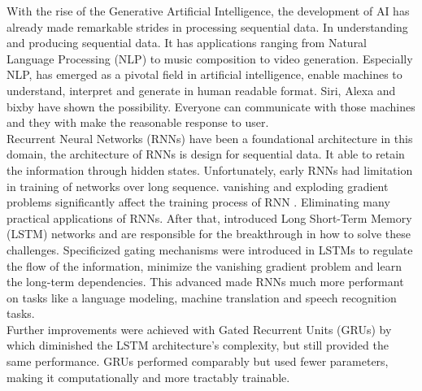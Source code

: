 \documentclass[12pt,a4paper]{article}
\begin{document}
With the rise of the Generative Artificial Intelligence, the development of AI has already made remarkable strides in processing sequential data. In understanding and producing sequential data. It has applications ranging from Natural Language Processing (NLP) to music composition to video generation. Especially NLP, has emerged as a pivotal field in artificial intelligence, enable machines to understand, interpret and generate in human readable format. Siri, Alexa and bixby have shown the possibility. Everyone can communicate with those machines and they with make the reasonable response to user.\\[2ex]
Recurrent Neural Networks (RNNs) have been a foundational architecture in this domain, the architecture of RNNs is design for sequential data. It able to retain the information through hidden states. Unfortunately, early RNNs had limitation in training of networks over long sequence. vanishing and exploding gradient problems significantly affect the training process of RNN \parencite{bengio1994learning}. Eliminating many practical applications of RNNs. After that, \parencite{hochreiter1997lstm} introduced Long Short-Term Memory (LSTM) networks and are responsible for the breakthrough in how to solve these challenges. Specificized gating mechanisms were introduced in LSTMs to regulate the flow of the information, minimize the vanishing gradient problem and learn the long-term dependencies. This advanced made RNNs much more performant on tasks like a language modeling, machine translation and speech recognition tasks.\\[2ex]
Further improvements were achieved with Gated Recurrent Units (GRUs) by \parencite{cho2014properties} which diminished the LSTM architecture's complexity, but still provided the same performance. GRUs performed comparably but used fewer parameters, making it computationally and more tractably trainable.

\newpage
\end{document}
